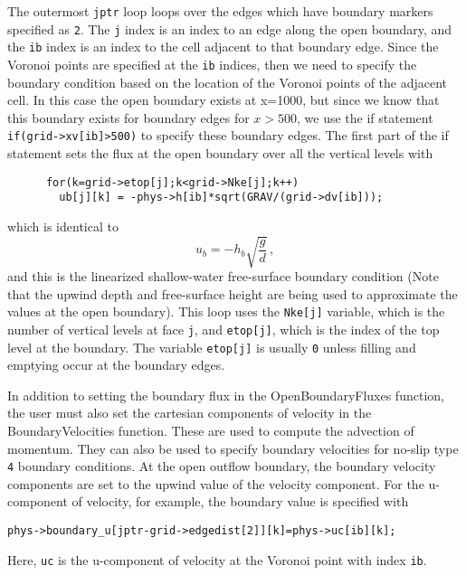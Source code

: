 The outermost \verb+jptr+ loop loops over the edges which have boundary markers specified as \verb+2+.
The \verb+j+ index is an index to an edge along the open boundary, and 
the \verb+ib+ index is an index to the cell adjacent to that boundary edge.  Since the Voronoi points
are specified at the \verb+ib+ indices, then we need to specify the boundary condition based on
the location of the Voronoi points of the adjacent cell.  In this case the open boundary exists at x=1000, but since
we know that this boundary exists for boundary edges for $x>500$, we use the if statement
\verb+if(grid->xv[ib]>500)+ to specify these boundary edges.  The first part of the if statement
sets the flux at the open boundary over all the vertical levels with
\begin{verbatim}
      for(k=grid->etop[j];k<grid->Nke[j];k++) 
        ub[j][k] = -phys->h[ib]*sqrt(GRAV/(grid->dv[ib]));
\end{verbatim}
which is identical to 
\[ u_b = -h_b\sqrt{\frac{g}{d}} \,,\]
and this is the linearized shallow-water free-surface boundary condition (Note that the upwind depth
and free-surface height are being used to approximate the values at the open boundary).  This loop uses
the \verb+Nke[j]+ variable, which is the number of vertical levels at face \verb+j+,
and \verb+etop[j]+, which is the index of the top level at the boundary.  The variable
\verb+etop[j]+ is usually \verb+0+ unless filling and emptying occur at the boundary
edges.  

In addition to setting
the boundary flux in the OpenBoundaryFluxes function, the user must also set the cartesian components
of velocity in the BoundaryVelocities function.  These are used to compute the advection of momentum. 
They can also be used to specify boundary velocities for no-slip type \verb+4+ boundary conditions.
At the open outflow boundary, the boundary velocity components are set to the upwind value of the velocity
component.  For the u-component of velocity, for example, the boundary value is specified
with
\begin{verbatim}
phys->boundary_u[jptr-grid->edgedist[2]][k]=phys->uc[ib][k];
\end{verbatim}
Here, \verb+uc+ is the u-component of velocity at the Voronoi point with index \verb+ib+.

